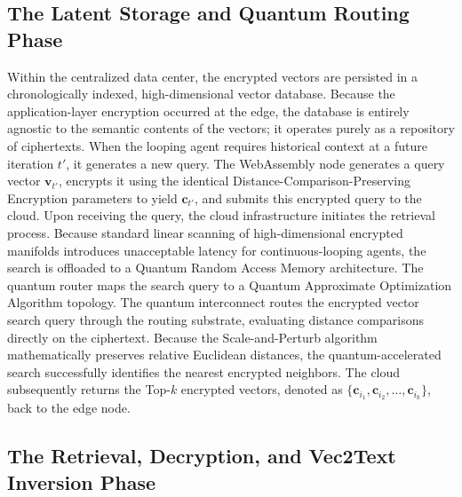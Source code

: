 \documentclass[12pt]{article}
\begin{document}
\subsection{The Latent Storage and Quantum Routing Phase}

Within the centralized data center, the encrypted vectors are persisted in a chronologically indexed, high-dimensional vector database. Because the application-layer encryption occurred at the edge, the database is entirely agnostic to the semantic contents of the vectors; it operates purely as a repository of ciphertexts. When the looping agent requires historical context at a future iteration $t'$, it generates a new query. The WebAssembly node generates a query vector $\mathbf{v}_{t'}$, encrypts it using the identical Distance-Comparison-Preserving Encryption parameters to yield $\mathbf{c}_{t'}$, and submits this encrypted query to the cloud. Upon receiving the query, the cloud infrastructure initiates the retrieval process. Because standard linear scanning of high-dimensional encrypted manifolds introduces unacceptable latency for continuous-looping agents, the search is offloaded to a Quantum Random Access Memory architecture. The quantum router maps the search query to a Quantum Approximate Optimization Algorithm topology. The quantum interconnect routes the encrypted vector search query through the routing substrate, evaluating distance comparisons directly on the ciphertext. Because the Scale-and-Perturb algorithm mathematically preserves relative Euclidean distances, the quantum-accelerated search successfully identifies the nearest encrypted neighbors. The cloud subsequently returns the Top-$k$ encrypted vectors, denoted as $\{\mathbf{c}_{i_1}, \mathbf{c}_{i_2}, \ldots, \mathbf{c}_{i_k}\}$, back to the edge node.

\subsection{The Retrieval, Decryption, and Vec2Text Inversion Phase}
\end{document}
